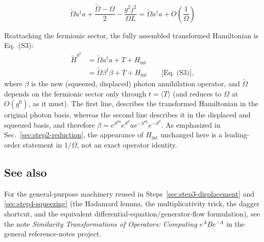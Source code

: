 \documentclass[../../main.tex]{subfiles}
\begin{document}
\begin{equation}
    \tilde \Omega a^\dagger a + \frac{\tilde \Omega - \Omega}{2} - \frac{g^2 j^2}{\Omega L} = \tilde \Omega a^\dagger a + O (\frac{1}{\Omega})
\end{equation}

Reattaching the fermionic sector, the fully assembled transformed
Hamiltonian is Eq.~(S3):
\begin{align}
\tilde H^{g^2}&=\tilde\Omega a^\dagger a+T+H_{\mathrm{int}} \\
&=\tilde\Omega \beta^\dagger\beta+T+H_{\mathrm{int}}
\qquad\text{[Eq.~(S3)]},
\end{align}
where $\beta$ is the new (squeezed, displaced) photon annihilation operator,
and $\tilde\Omega$ depends on the fermionic sector only through $t=\langle T\rangle$
(and reduces to $\Omega$ at $O(g^0)$, as it must). The first line, describes the transformed Hamiltonian in the original photon basis, whereas the second line describes it in the displaced and squeezed basis, and therefore $\beta = e^{S^\mathrm{sq}} e^{S^\mathrm{d}} a e^{-S^\mathrm{sq}} e^{-S^\mathrm{d}}$. As emphasized in
Sec.~\ref{sec:step2-reduction}, the appearance of $H_{\mathrm{int}}$ unchanged
here is a leading-order statement in $1/\Omega$, not an exact operator
identity.

\subsection*{See also}
For the general-purpose machinery reused in Steps~\ref{sec:step3-displacement}
and \ref{sec:step4-squeezing} (the Hadamard lemma, the multiplicativity trick,
the dagger shortcut, and the equivalent differential-equation/generator-flow
formulation), see the note \emph{Similarity Transformations of Operators:
Computing $e^{A}Be^{-A}$} in the general reference-notes project.
\end{document}
